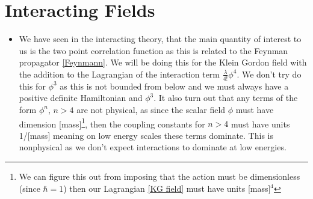 \documentclass[11pt]{article}
\numberwithin{equation}{section}
\begin{document}
\section{Interacting Fields} %
\label{interacting_fields}
\begin{itemize}
  \item We have seen in the interacting theory, that the main quantity of interest to us is the two point correlation function as this is related to the Feynman propagator \ref{Feynmann}. We will be doing this for the Klein Gordon field with the addition to the Lagrangian of the interaction term $\frac{\lambda}{4!}\phi^4$. We don't try do this for $\phi^3$ as this is not bounded from below and we must always have a positive definite Hamiltonian and $\phi^3$. It also turn out that any terms of the form $\phi^n$, $n>4$ are not physical, as since the scalar field $\phi$ must have dimension [mass]\footnote{We can figure this out from imposing that the action must be dimensionless (since $\hbar=1$) then our Lagrangian \ref{KG field} must have units [mass]$^4$}, then the coupling constants for $n>4$ must have units 1/[mass] meaning on low energy scales these terms dominate. This is nonphysical as we don't expect interactions to dominate at low energies.  
\end{itemize}
\end{document}
